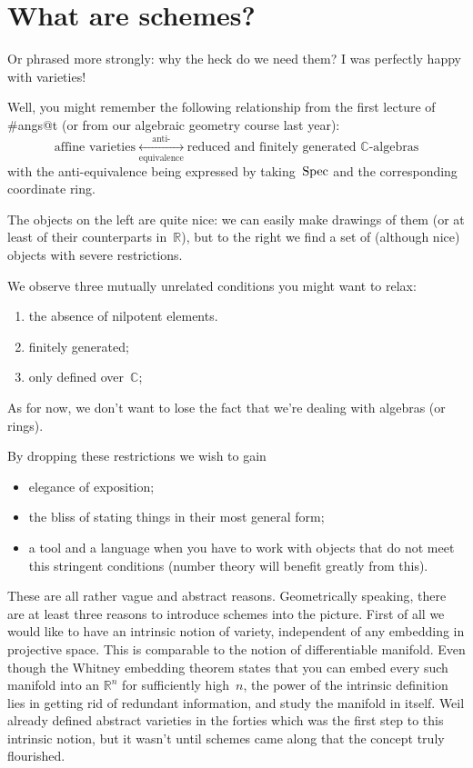 \section{What are schemes?}

Or phrased more strongly: why the heck do we need them? I was perfectly happy with varieties!

Well, you might remember the following relationship from the first lecture of \#angs@t (or from our algebraic geometry course last year):
\begin{equation}
  \label{equation:variety-anti-equivalence}
  \text{affine varieties} \underset{\text{equivalence}}{\overset{\text{anti-}}{\longleftrightarrow}} \text{reduced and finitely generated $\mathbb{C}$-algebras}
\end{equation}
with the anti-equivalence being expressed by taking~$\operatorname{Spec}$ and the corresponding coordinate ring.

The objects on the left are quite nice: we can easily make drawings of them (or at least of their counterparts in~$\mathbb{R}$), but to the right we find a set of (although nice) objects with severe restrictions.

We observe three mutually unrelated conditions you might want to relax:
\begin{enumerate}
  \item the absence of nilpotent elements.
  \item finitely generated;
  \item only defined over~$\mathbb{C}$;
\end{enumerate}
As for now, we don't want to lose the fact that we're dealing with algebras (or rings).

By dropping these restrictions we wish to gain
\begin{itemize}
  \item elegance of exposition;
  \item the bliss of stating things in their most general form;
  \item a tool and a language when you have to work with objects that do not meet this stringent conditions (number theory will benefit greatly from this).
\end{itemize}

These are all rather vague and abstract reasons. Geometrically speaking, there are at least three reasons to introduce schemes into the picture. First of all we would like to have an intrinsic notion of variety, independent of any embedding in projective space. This is comparable to the notion of differentiable manifold. Even though the Whitney embedding theorem states that you can embed every such manifold into an $\mathbb{R}^{n}$ for sufficiently high~$n$, the power of the intrinsic definition lies in getting rid of redundant information, and study the manifold in itself. Weil already defined abstract varieties in the forties which was the first step to this intrinsic notion, but it wasn't until schemes came along that the concept truly flourished.

